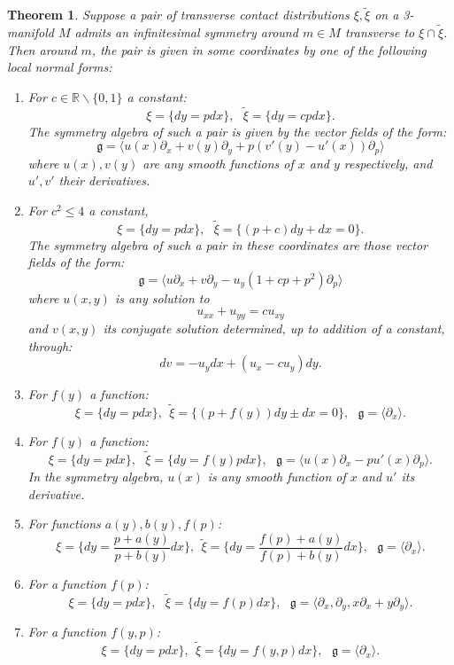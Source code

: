 \documentclass[10pt]{amsart}
\newcommand{\R}{\mathbb{R}}
\newcommand{\del}{\partial}
\newtheorem{thm}{Theorem}[section]
\theoremstyle{definition}
\begin{document}
\begin{thm}\label{thm:lnf} Suppose a pair of transverse contact distributions $\xi, \tilde \xi$ on a 3-manifold $M$ admits an infinitesimal symmetry around $m\in M$ transverse to $\xi\cap\tilde \xi$. Then around $m$, the pair is given in some coordinates by one of the following local normal forms:

\begin{enumerate}
    \item[(I$_1$)] For $c\in \R\backslash \{ 0,1\}$ a constant: \[ \xi = \{ dy = pdx\}, ~~~\tilde \xi = \{ dy = c p dx\}.\]
    The symmetry algebra of such a pair is given by the vector fields of the form:
    \[\mathfrak{g} = \langle u(x) \del_x + v(y)\del_y +  p(v'(y) - u'(x))\del_p\rangle \]
    where $u(x), v(y)$ are any smooth functions of $x$ and $y$ respectively, and $u', v'$ their derivatives.

     \item[(I$_2$)] For $c^2\le 4$ a constant,
      \[ \xi = \{ dy = pdx\}, ~~~\tilde \xi = \{ (p+c)dy + dx = 0\}.\]
      The symmetry algebra of such a pair in these coordinates are those vector fields of the form: 
       \[\mathfrak{g} = \langle u\del_x + v\del_y - u_y(1 + cp + p^2)\del_p \rangle \]
      where $u(x,y)$ is any solution to
      \[ u_{xx} + u_{yy} = c u_{xy} \]
      and $v(x,y)$ its conjugate solution determined, up to addition of a constant, through:
      \[ dv = -u_y dx + (u_x - c u_y)dy. \]
    
     \item[(II$_1$)] For $f(y)$ a function:
     \[ \xi = \{ dy = pdx\} , ~~\tilde \xi = \{ (p +f(y)) dy \pm dx = 0 \}, ~~~\mathfrak{g} = \langle \del_x\rangle. \]
    
    
    \item[(II$_2$)] For $f(y)$ a function:
    \[ \xi = \{ dy = pdx\}, ~~~\tilde \xi = \{ dy = f(y) pdx\}, ~~~\mathfrak{g} = \langle u(x)\del_x - pu'(x)\del_p \rangle. \]
In the symmetry algebra, $u(x)$ is any smooth function of $x$ and $u'$ its derivative.

    \item[(III$_1$)] For functions $a(y), b(y), f(p)$: 
    \[ \xi = \{  dy = \frac{p + a(y)}{p + b(y)} dx \} , ~~\tilde \xi = \{ dy = \frac{f(p) + a(y)}{f(p) + b(y)} dx \}, ~~~\mathfrak{g} = \langle \del_x \rangle. \]

    \item[(III$_2$)] For a function $f(p)$:
    \[ \xi = \{ dy = p dx\}, ~~~\tilde \xi = \{ dy =  f(p)dx\}, ~~~\mathfrak{g} =  \langle \del_x, \del_y, x\del_x + y\del_y\rangle. \]

    \item[(IV)] For a function $f(y,p)$:
    \[ \xi = \{ dy = pdx\}, ~~\tilde \xi = \{ dy  = f(y,p)dx\}, ~~~\mathfrak{g} = \langle \del_x\rangle. \]
    
  \end{enumerate}
\end{thm}
\end{document}
